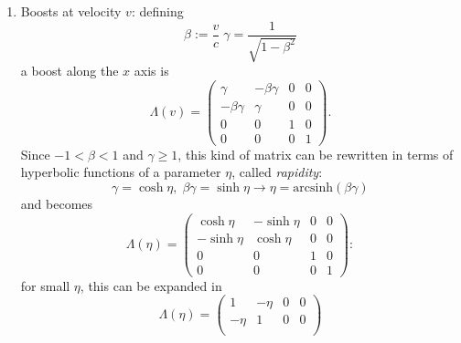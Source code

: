 \begin{enumerate}
    Similarly,
    \[
        J^1 = \begin{pmatrix}
            0&0&0&0\\
            0&0&0&0\\
            0&0&0&-i\\
            0&0&i&0
        \end{pmatrix}\;J^2=
        \begin{pmatrix}
            0&0&0&0\\
            0&0&0&i\\
            0&0&0&0\\
            0&-i&0&0
        \end{pmatrix} 
    \]
    generate, respectively, rotations about $x,y$ axis.

    These three generators \textbf{satisfy the} $SU(2)$ \textbf{algebra}:
    \[
        \left[J^a,J^b\right] = i\varepsilon^{abc}J^c
    \]
    \textbf{Note}: the $\Lambda$ made from proper rotations are connected to
    the identity and so can be generated from the algebra, while using improper
    rotations (i.e. $O(3)\setminus SO(3)$) produces $\Lambda$ that are not.
\item Boosts at velocity $v$: defining
\[
    \beta:=\frac{v}{c}\;\gamma = \frac{1}{\sqrt{1-\beta^2}}
\]
a boost along the $x$ axis is
\[
    \Lambda(v) = \begin{pmatrix}
        \gamma&-\beta\gamma&0&0\\
        -\beta\gamma&\gamma&0&0\\
        0&0&1&0\\
        0&0&0&1
    \end{pmatrix}.
\]
Since $-1<\beta<1$ and $\gamma\geq 1$, this kind of matrix can be rewritten in
terms of hyperbolic functions of a parameter $\eta$, called \textit{rapidity}:
\[
    \gamma=\cosh\eta,\;\beta\gamma=\sinh\eta \longrightarrow \eta =
    \text{arcsinh}(\beta\gamma)
\]
and becomes
\[
    \Lambda(\eta) = 
    \begin{pmatrix}
        \cosh\eta&-\sinh\eta&0&0\\
        -\sinh\eta&\cosh\eta&0&0\\
        0&0&1&0\\
        0&0&0&1
    \end{pmatrix}:
\]
for small $\eta$, this can be expanded in
\[
    \Lambda(\eta) = \begin{pmatrix}
        1&-\eta&0&0\\
        -\eta&1&0&0\\

\end{pmatrix}\]
\end{enumerate}

